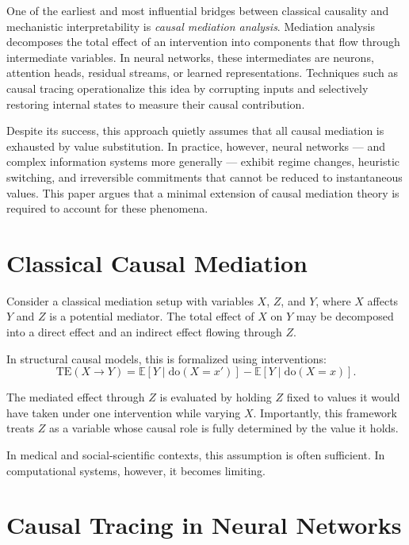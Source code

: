 \documentclass[11pt]{article}
\newcommand{\doop}{\mathrm{do}}
\begin{document}
One of the earliest and most influential bridges between classical causality and mechanistic interpretability is \emph{causal mediation analysis}. Mediation analysis decomposes the total effect of an intervention into components that flow through intermediate variables. In neural networks, these intermediates are neurons, attention heads, residual streams, or learned representations. Techniques such as causal tracing operationalize this idea by corrupting inputs and selectively restoring internal states to measure their causal contribution.

Despite its success, this approach quietly assumes that all causal mediation is exhausted by value substitution. In practice, however, neural networks — and complex information systems more generally — exhibit regime changes, heuristic switching, and irreversible commitments that cannot be reduced to instantaneous values. This paper argues that a minimal extension of causal mediation theory is required to account for these phenomena.

\section{Classical Causal Mediation}

Consider a classical mediation setup with variables \(X\), \(Z\), and \(Y\), where \(X\) affects \(Y\) and \(Z\) is a potential mediator. The total effect of \(X\) on \(Y\) may be decomposed into a direct effect and an indirect effect flowing through \(Z\).

In structural causal models, this is formalized using interventions:
\[
\mathrm{TE}(X \to Y) 
= \mathbb{E}[Y \mid \doop(X=x')] - \mathbb{E}[Y \mid \doop(X=x)].
\]

The mediated effect through \(Z\) is evaluated by holding \(Z\) fixed to values it would have taken under one intervention while varying \(X\). Importantly, this framework treats \(Z\) as a variable whose causal role is fully determined by the value it holds.

In medical and social-scientific contexts, this assumption is often sufficient. In computational systems, however, it becomes limiting.

\section{Causal Tracing in Neural Networks}
\end{document}

